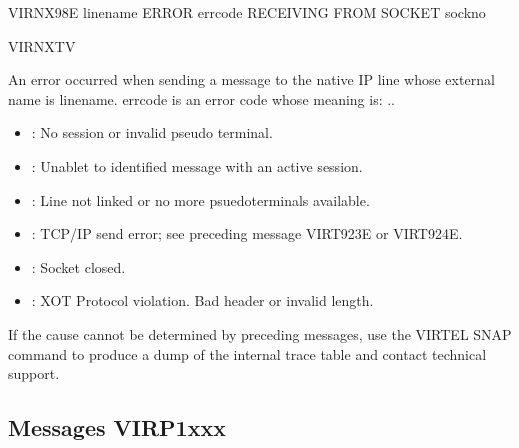 \documentclass[letterpaper,10pt,english]{sphinxmanual}
\begin{document}
\sphinxAtStartPar
VIRNX98E linename ERROR errcode RECEIVING FROM SOCKET sockno
\begin{description}
\sphinxAtStartPar
VIRNXTV

\sphinxAtStartPar
An error occurred when sending a message to the native IP line whose external name is linename. errcode is an error code whose meaning is:
..
\begin{itemize}
\item {} 
 : No session or invalid pseudo terminal.

\item {} 
 : Unablet to identified message with an active session.

\item {} 
 : Line not linked or no more psuedo\sphinxhyphen{}terminals available.

\item {} 
 : TCP/IP send error; see preceding message VIRT923E or VIRT924E.

\item {} 
 : Socket closed.

\item {} 
 : XOT Protocol violation. Bad header or invalid length.

\end{itemize}

\sphinxAtStartPar
If the cause cannot be determined by preceding messages, use the VIRTEL SNAP command to produce a dump of the internal trace table and contact technical support.

\end{description}


\subsection{Messages VIRP1xxx}
\label{\detokenize{messages:messages-virp1xxx}}
\end{document}
